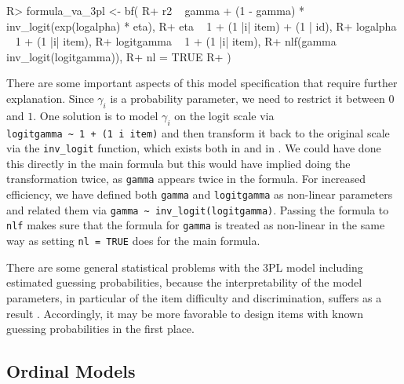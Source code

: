 \documentclass[jss]{jss}
\begin{document}
\begin{CodeChunk}

\begin{CodeInput}
R> formula_va_3pl <- bf(
R+   r2 ~ gamma + (1 - gamma) * inv_logit(exp(logalpha) * eta),
R+   eta ~ 1 + (1 |i| item) + (1 | id),
R+   logalpha ~ 1 + (1 |i| item),
R+   logitgamma ~ 1 + (1 |i| item),
R+   nlf(gamma ~ inv_logit(logitgamma)),
R+   nl = TRUE
R+ )
\end{CodeInput}
\end{CodeChunk}

There are some important aspects of this model specification that
require further explanation. Since \(\gamma_i\) is a probability
parameter, we need to restrict it between \(0\) and \(1\). One solution
is to model \(\gamma_i\) on the logit scale via
\texttt{logitgamma\ \textasciitilde{}\ 1\ +\ (1\ \textbar{}i\textbar{}\ item)}
and then transform it back to the original scale via the
\texttt{inv\_logit} function, which exists both in  and in
. We could have done this directly in the main formula
but this would have implied doing the transformation twice, as
\texttt{gamma} appears twice in the formula. For increased efficiency,
we have defined both \texttt{gamma} and \texttt{logitgamma} as
non-linear parameters and related them via
\texttt{gamma\ \textasciitilde{}\ inv\_logit(logitgamma)}. Passing the
formula to \texttt{nlf} makes sure that the formula for \texttt{gamma}
is treated as non-linear in the same way as setting \texttt{nl\ =\ TRUE}
does for the main formula.

There are some general statistical problems with the 3PL model including
estimated guessing probabilities, because the interpretability of the
model parameters, in particular of the item difficulty and
discrimination, suffers as a result \citep{han2012}. Accordingly, it may
be more favorable to design items with known guessing probabilities in
the first place.

\hypertarget{ordinal}{%
\subsection{Ordinal Models}\label{ordinal}}
\end{document}
